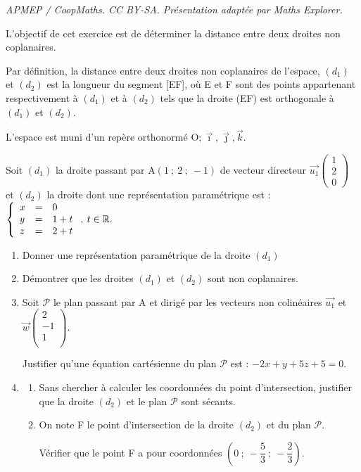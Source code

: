 \documentclass[10pt]{article}
\providecommand{\R}{\mathbb{R}}
\providecommand{\vect}[1]{\overrightarrow{#1}}
\providecommand{\Oijk}{\(\mathrm{O};\vec{\imath},\vec{\jmath},\vec{k}\)}
\begin{document}
\noindent\textit{APMEP / CoopMaths. CC BY-SA. Présentation adaptée par Maths Explorer.}\par\medskip
\medskip

L'objectif de cet exercice est de déterminer la distance entre deux droites non coplanaires.

Par définition, la distance entre deux droites non coplanaires de l'espace, $(d_1)$ et $(d_2)$ est la longueur du segment [EF], où E et F sont des points appartenant respectivement à $(d_1)$ et à $(d_2)$ tels que la droite (EF) est orthogonale à $(d_1)$ et $(d_2)$.

L'espace est muni d'un repère orthonormé \Oijk.

Soit $(d_1)$ la droite passant par A$(1~;~2~;~-1)$ de vecteur directeur $\vect{u_1}\begin{pmatrix}1\\2\\0\end{pmatrix}$ et $(d_2)$ la droite dont une représentation paramétrique est : 
$\left\{\begin{array}{l c l}
x&=&0\\y &=& 1 + t\\z &=& 2 + t\\
\end{array}\right.,\: t  \in \R.$

\medskip

\begin{enumerate}
\item Donner une représentation paramétrique de la droite $(d_1)$
\item Démontrer que les droites $(d_1)$ et $(d_2)$ sont non coplanaires.
\item Soit $\mathcal{P}$ le plan passant par A et dirigé par les vecteurs non colinéaires $\vect{u_1}$ et $\vect{w}\begin{pmatrix}2\\-1\\1\\\end{pmatrix}$.

Justifier qu'une équation cartésienne du plan $\mathcal{P}$ est : $-2x +y +5z +5 = 0$.
\item
	\begin{enumerate}
		\item Sans chercher à calculer les coordonnées du point d'intersection, justifier que la droite
$(d_2)$ et le plan $\mathcal{P}$ sont sécants.
		\item On note F le point d'intersection de la droite $(d_2)$ et du plan $\mathcal{P}$.
		
Vérifier que le point F a pour coordonnées $\left(0~;~- \dfrac53~;~- \dfrac23\right)$.
\end{enumerate}
\end{enumerate}
		
\end{document}

